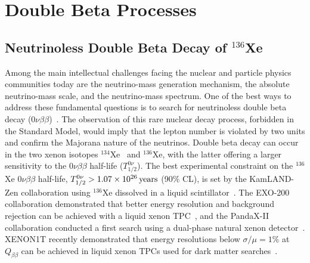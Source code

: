\section{Double Beta Processes}\label{sec:doublebeta}

\subsection{Neutrinoless Double Beta Decay of \texorpdfstring{$^{136}$Xe}{Xenon-136}} \label{sec:0nubb}

Among the main intellectual challenges facing the nuclear and particle physics communities today are the neutrino-mass generation mechanism, the absolute neutrino-mass scale, and the neutrino-mass spectrum. One of the best ways to address these fundamental questions is to search for neutrinoless double beta decay ($0\nu\beta\beta$)~\cite{Avignone:2007fu, Dolinski:2019nrj}. The observation of this rare nuclear decay process, forbidden in the Standard Model, would imply that the lepton number is violated by two units and confirm the Majorana nature of the neutrinos. Double beta decay can occur in the two xenon isotopes $^{134}$Xe~\cite{LZ:2021rff} and $^{136}$Xe, with the latter offering a larger sensitivity to the $0\nu\beta\beta$ half-life ($T^{0\nu}_{1/2}$). The best experimental constraint on the $^{136}$Xe $0\nu\beta\beta$ half-life, $T^{0\nu}_{1/2} > 1.07 \times 10^{26}\, \mathrm{years}$ (90\% CL), is set by the KamLAND-Zen collaboration using $^{136}$Xe dissolved in a liquid scintillator~\cite{KamLAND-Zen:2016pfg}. The EXO-200 collaboration demonstrated that better energy resolution and background rejection can be achieved with a liquid xenon TPC~\cite{Albert:2017owj}, and the PandaX-II collaboration conducted a first search using a dual-phase natural xenon detector~\cite{Ni:2019kms}. XENON1T recently demonstrated that energy resolutions below $\sigma/\mu=1$\% at $Q_{\beta\beta}$ can be achieved in liquid xenon TPCs used for dark matter searches~\cite{XENON:2020iwh}.

